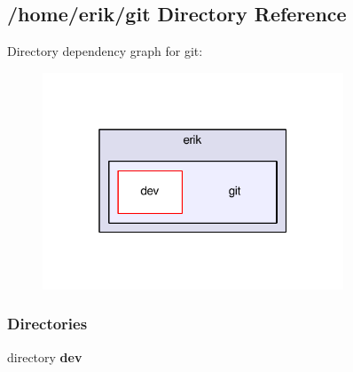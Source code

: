 \subsection{/home/erik/git Directory Reference}
\label{dir_bf9e992809f77125719480446fb48719}
Directory dependency graph for git\+:
\nopagebreak
\begin{figure}[H]
\begin{center}
\leavevmode
\includegraphics[width=254pt]{dir_bf9e992809f77125719480446fb48719_dep}
\end{center}
\end{figure}
\subsubsection*{Directories}
\begin{DoxyCompactItemize}
\item 
directory {\bf dev}
\end{DoxyCompactItemize}
